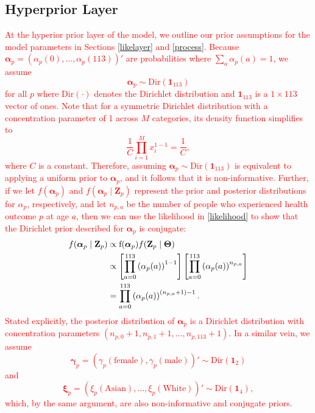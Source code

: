 \documentclass[final]{statsoc}
\begin{document}
\subsection{Hyperprior Layer}\label{sec:hyperprior}
\textcolor{red}{At the hyperior prior layer of the model, we outline our prior assumptions for the model
parameters in Sections \ref{likelayer} and \ref{process}. Because $\boldsymbol{\alpha}_p = 
(\alpha_p(0),\dots,\alpha_p(113))'$ are probabilities where $\sum_a \alpha_p(a) = 1$, 
we assume $$\boldsymbol{\alpha}_{p} \sim \text{Dir}(\mathbf{1}_{113})$$ for all $p$ where 
$\text{Dir}(\cdot)$ denotes the Dirichlet distribution and $\mathbf{1}_{113}$ is a $1\times 113$ vector of ones. Note that for a symmetric Dirichlet distribution with a concentration parameter of 1 across $M$ categories, its density function simplifies to 
\begin{equation}
\frac{1}{C}\prod_{i=1}^M x_i^{1 - 1} = \frac{1}{C},
\end{equation}
where $C$ is a constant. Therefore, assuming $\boldsymbol\alpha_p \sim \text{Dir}(\mathbf{1}_{113})$ is equivalent to applying a uniform prior to $\boldsymbol\alpha_p$, and it follows that it is non-informative. Further, if we let $f(\boldsymbol\alpha_p)$ and $f(\boldsymbol\alpha_p \mid \mathbf{Z}_p)$ represent the prior and posterior distributions for $\alpha_p$, respectively, and let $n_{p,a}$ be the number of people who experienced health outcome $p$ at age $a$, then we can use the likelihood in \eqref{likelihood} to show that the Dirichlet prior described for $\boldsymbol{\alpha}_p$ is conjugate:  
\begin{align}
f(\boldsymbol{\alpha}_p \mid \mathbf{Z}_p) &\propto \text{f}(\boldsymbol{\alpha}_p)f(\mathbf{Z}_p \mid \boldsymbol\Theta) \notag \\
&\propto \left[\prod_{a=0}^{113}\left(\alpha_p(a)\right)^{1-1}\right]\left[\prod_{a=0}^{113} \left(\alpha_p(a)\right)^{n_{p,a}}\right]  \label{apost} \\
&= \prod_{a=0}^{113} \left(\alpha_p(a)\right)^{(n_{p,a}+1)-1}. \notag
\end{align} 
Stated explicitly, the posterior distribution of $\boldsymbol\alpha_p$ is a Dirichlet distribution with concentration parameters $(n_{p,0} + 1, n_{p,1} + 1, \dots, n_{p,113}+1)$.
In a similar vein, we assume $$\boldsymbol\gamma_p = (\gamma_p(\text{female}), \gamma_p(\text{male}))' \sim \text{Dir}(\mathbf{1}_2)$$ and $$\boldsymbol\xi_p = (\xi_p(\text{Asian}), \dots, \xi_p(\text{White}))' \sim \text{Dir}(\mathbf{1}_4),$$ which, by the same argument, are also non-informative and conjugate priors.}
\end{document}
